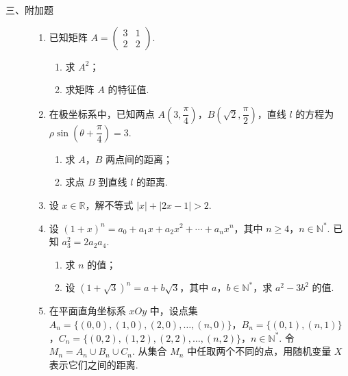 \begin{description}
\begin{enumerate}[leftmargin=5pt]
    \end{enumerate}

\end{description}

\begin{description}

    \item[三、附加题]

    \begin{enumerate}[leftmargin=5pt]

      \addtocounter{enumi}{+20}

        \item [A]
已知矩阵 \(A=\begin{pmatrix}3&1\\2&2\end{pmatrix}\).

\begin{enumerate}
\item 求 \(A^2\)；
\item 求矩阵 \(A\) 的特征值.
\end{enumerate}

        \item [B]
在极坐标系中，已知两点 \(A\!\left(3,\dfrac{\pi}{4}\right)\)，\(B\!\left(\sqrt2,\dfrac{\pi}{2}\right)\)，直线 \(l\) 的方程为 \(\rho\sin\left(\theta+\dfrac{\pi}{4}\right)=3\).

\begin{enumerate}
\item 求 \(A\)，\(B\) 两点间的距离；
\item 求点 \(B\) 到直线 \(l\) 的距离.
\end{enumerate}

        \item [C]
设 \(x\in\mathbb{R}\)，解不等式 \(|x|+|2x-1|>2\).

        \item 设 \((1+x)^n=a_0+a_1x+a_2x^2+\cdots+a_nx^n\)，其中 \(n\ge 4\)，\(n\in\mathbb{N}^*\). 已知 \(a_3^2=2a_2a_4\).

\begin{enumerate}
\item 求 \(n\) 的值；
\item 设 \((1+\sqrt3)^n=a+b\sqrt3\)，其中 \(a\)，\(b\in\mathbb{N}^*\)，求 \(a^2-3b^2\) 的值.
\end{enumerate}

        \item 在平面直角坐标系 \(xOy\) 中，设点集 \(A_n=\{(0,0),(1,0),(2,0),\dots,(n,0)\}\)，\(B_n=\{(0,1),(n,1)\}\)，\(C_n=\{(0,2),(1,2),(2,2),\dots,(n,2)\}\)，\(n\in\mathbb{N}^*\).
令 \(M_n=A_n\cup B_n\cup C_n\). 从集合 \(M_n\) 中任取两个不同的点，用随机变量 \(X\) 表示它们之间的距离.


\end{enumerate}
\end{description}
